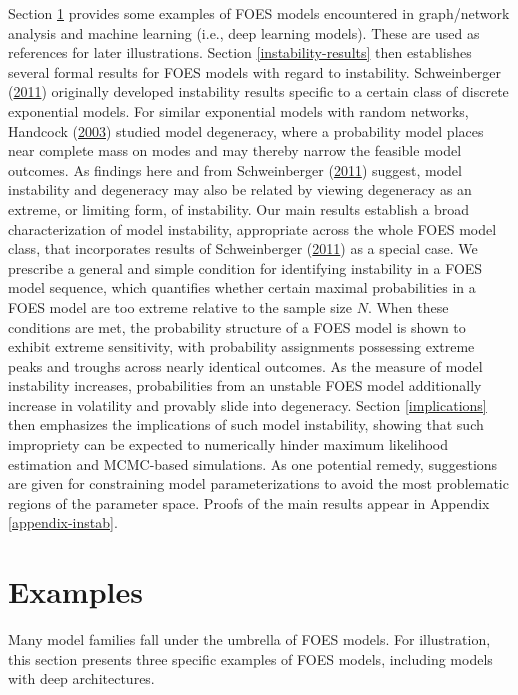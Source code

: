 \documentclass[]{article}
\theoremstyle{definition}
\begin{document}
Section \ref{examples} provides some examples of FOES models encountered
in graph/network analysis and machine learning (i.e., deep learning
models). These are used as references for later illustrations. Section
\ref{instability-results} then establishes several formal results for
FOES models with regard to instability. Schweinberger
(\protect\hyperlink{ref-schweinberger2011instability}{2011}) originally
developed instability results specific to a certain class of discrete
exponential models. For similar exponential models with random networks,
Handcock (\protect\hyperlink{ref-handcock2003assessing}{2003}) studied
model degeneracy, where a probability model places near complete mass on
modes and may thereby narrow the feasible model outcomes. As findings
here and from Schweinberger
(\protect\hyperlink{ref-schweinberger2011instability}{2011}) suggest,
model instability and degeneracy may also be related by viewing
degeneracy as an extreme, or limiting form, of instability. Our main
results establish a broad characterization of model instability,
appropriate across the whole FOES model class, that incorporates results
of Schweinberger
(\protect\hyperlink{ref-schweinberger2011instability}{2011}) as a
special case. We prescribe a general and simple condition for
identifying instability in a FOES model sequence, which quantifies
whether certain maximal probabilities in a FOES model are too extreme
relative to the sample size \(N\). When these conditions are met, the
probability structure of a FOES model is shown to exhibit extreme
sensitivity, with probability assignments possessing extreme peaks and
troughs across nearly identical outcomes. As the measure of model
instability increases, probabilities from an unstable FOES model
additionally increase in volatility and provably slide into degeneracy.
Section \ref{implications} then emphasizes the implications of such
model instability, showing that such impropriety can be expected to
numerically hinder maximum likelihood estimation and MCMC-based
simulations. As one potential remedy, suggestions are given for
constraining model parameterizations to avoid the most problematic
regions of the parameter space. Proofs of the main results appear in
Appendix \ref{appendix-instab}.

\section{Examples}\label{examples}

Many model families fall under the umbrella of FOES models. For
illustration, this section presents three specific examples of FOES
models, including models with deep architectures.
\end{document}

